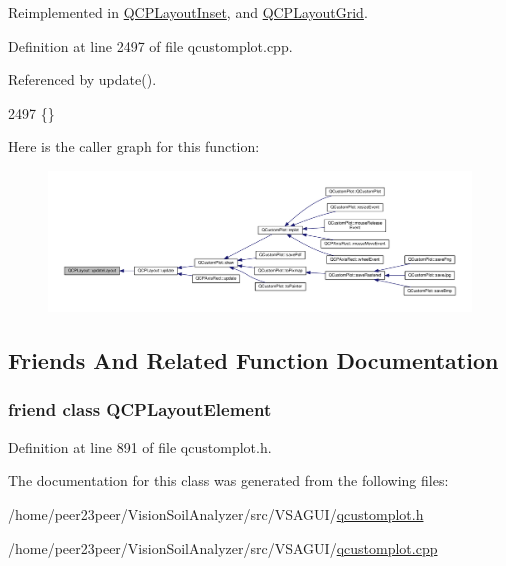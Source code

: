 Reimplemented in \hyperlink{class_q_c_p_layout_inset_a7b33fdd51b18e6db7cea9bfb2d263b4a}{Q\+C\+P\+Layout\+Inset}, and \hyperlink{class_q_c_p_layout_grid_a07f8dd7d3d61d7345026621d446042a4}{Q\+C\+P\+Layout\+Grid}.



Definition at line 2497 of file qcustomplot.\+cpp.



Referenced by update().


\begin{DoxyCode}
2497 \{\}
\end{DoxyCode}


Here is the caller graph for this function\+:\nopagebreak
\begin{figure}[H]
\begin{center}
\leavevmode
\includegraphics[width=350pt]{class_q_c_p_layout_a165c77f6287ac92e8d03017ad913378b_icgraph}
\end{center}
\end{figure}




\subsection{Friends And Related Function Documentation}
\hypertarget{class_q_c_p_layout_a0790750c7e7f14fdbd960d172655b42b}{}
\subsubsection[{Q\+C\+P\+Layout\+Element}]{\setlength{\rightskip}{0pt plus 5cm}friend class {\bf Q\+C\+P\+Layout\+Element}\hspace{0.3cm}{\ttfamily [friend]}}\label{class_q_c_p_layout_a0790750c7e7f14fdbd960d172655b42b}


Definition at line 891 of file qcustomplot.\+h.



The documentation for this class was generated from the following files\+:\begin{DoxyCompactItemize}
\item 
/home/peer23peer/\+Vision\+Soil\+Analyzer/src/\+V\+S\+A\+G\+U\+I/\hyperlink{qcustomplot_8h}{qcustomplot.\+h}\item 
/home/peer23peer/\+Vision\+Soil\+Analyzer/src/\+V\+S\+A\+G\+U\+I/\hyperlink{qcustomplot_8cpp}{qcustomplot.\+cpp}\end{DoxyCompactItemize}
